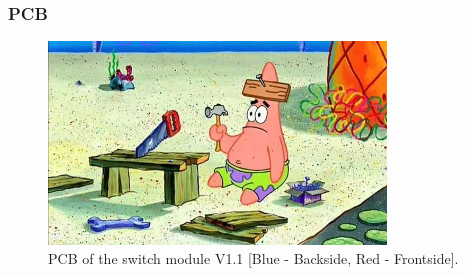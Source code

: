     \subsubsection{PCB}
       

        \begin{figure}[H]
            \centering
            \includegraphics[width=0.8\textwidth]{assets/HW/TBD.png}
            \caption{PCB of the switch module V1.1 [Blue - Backside, Red - Frontside].}
        \end{figure}